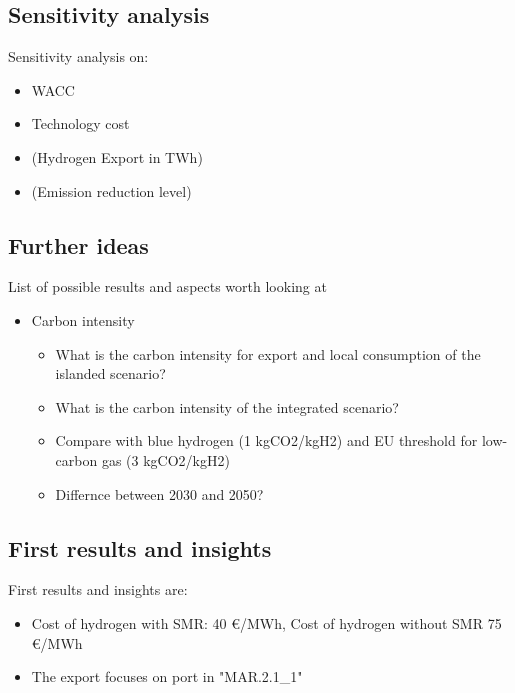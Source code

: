 \subsection{Sensitivity analysis}
Sensitivity analysis on:
\begin{itemize}
    \item WACC
    \item Technology cost
    \item (Hydrogen Export in TWh)
    \item (Emission reduction level)
\end{itemize}


\subsection{Further ideas}
List of possible results and aspects worth looking at
\begin{itemize}
    \item Carbon intensity
    \begin{itemize}
        \item What is the carbon intensity for export and local consumption of the islanded scenario? 
        \item What is the carbon intensity of the integrated scenario?
        \item Compare with blue hydrogen (1 kgCO2/kgH2) and EU threshold for low-carbon gas (3 kgCO2/kgH2)
        \item Differnce between 2030 and 2050?
    \end{itemize}
\end{itemize}



\subsection{First results and insights}

First results and insights are:
\begin{itemize}
    \item Cost of hydrogen with SMR: 40 €/MWh, Cost of hydrogen without SMR 75 €/MWh
    \item The export focuses on port in "MAR.2.1{\_}1"
\end{itemize}


